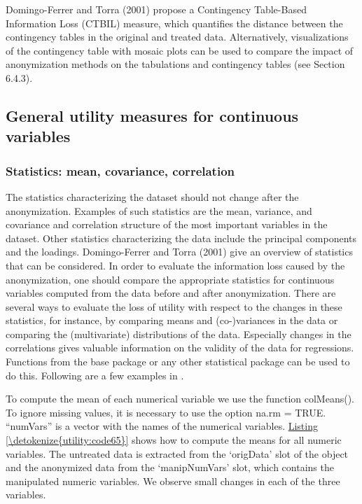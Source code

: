 \documentclass[letterpaper,10pt,english]{sphinxmanual}
\begin{document}
Domingo-Ferrer and Torra (2001) propose a Contingency Table-Based
Information Loss (CTBIL) measure, which quantifies the distance between
the contingency tables in the original and treated data. Alternatively,
visualizations of the contingency table with mosaic plots can be used to
compare the impact of anonymization methods on the tabulations and
contingency tables (see Section 6.4.3).


\subsection{General utility measures for continuous variables}
\label{\detokenize{utility:general-utility-measures-for-continuous-variables}}

\subsubsection{Statistics: mean, covariance, correlation}
\label{\detokenize{utility:statistics-mean-covariance-correlation}}
The statistics characterizing the dataset should not change after the
anonymization. Examples of such statistics are the mean, variance, and
covariance and correlation structure of the most important variables in
the dataset. Other statistics characterizing the data include the
principal components and the loadings. Domingo-Ferrer and Torra (2001)
give an overview of statistics that can be considered. In order to
evaluate the information loss caused by the anonymization, one should
compare the appropriate statistics for continuous variables computed
from the data before and after anonymization. There are several ways to
evaluate the loss of utility with respect to the changes in these
statistics, for instance, by comparing means and (co-)variances in the
data or comparing the (multivariate) distributions of the data.
Especially changes in the correlations gives valuable information on the
validity of the data for regressions. Functions from the  base
package or any other statistical package can be used to do this.
Following are a few examples in .

To compute the mean of each numerical variable we use the function
colMeans(). To ignore missing values, it is necessary to use the option
na.rm = TRUE. “numVars” is a vector with the names of the numerical
variables. \hyperref[\detokenize{utility:code65}]{Listing \ref{\detokenize{utility:code65}}} shows how to compute the means for all numeric
variables. The untreated data is extracted from the ‘origData’ slot of
the  object and the anonymized data from the ‘manipNumVars’
slot, which contains the manipulated numeric variables. We observe small
changes in each of the three variables.
\end{document}
